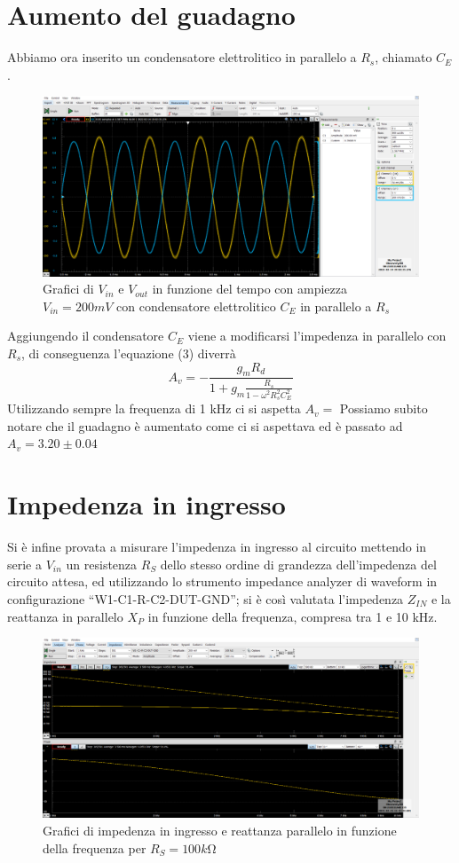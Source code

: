 \documentclass[10pt, a4paper, italian]{article}
\begin{document}
\section{Aumento del guadagno}
Abbiamo ora inserito un condensatore elettrolitico in parallelo a $R_s$, chiamato $C_E$.
\begin{figure}[H]
    \centering
	\includegraphics[scale=0.4]{amp.200.cap}
    \caption{Grafici di $V_{in}$ e $V_{out}$ in funzione del tempo con ampiezza $V_{in}=200 mV$ con condensatore elettrolitico $C_E$ in parallelo a $R_s$}
\end{figure}
Aggiungendo il condensatore $C_E$ viene a modificarsi l'impedenza in parallelo con $R_s$, di conseguenza l'equazione (3) diverrà
\begin{equation}
A_v =-\frac{g_m R_d}{1+g_m \frac{R_s}{1-\omega ^2 R_s^2 C_E^2}}
\end{equation}
Utilizzando sempre la frequenza di 1 kHz ci si aspetta $A_v =$
Possiamo subito notare che il guadagno è aumentato come ci si aspettava ed è passato ad $A_v =3.20 \pm 0.04$
\section{Impedenza in ingresso}
Si è infine provata a misurare l'impedenza in ingresso al circuito mettendo in serie a $V_{in}$ un resistenza $R_S$ dello stesso ordine di grandezza dell'impedenza del circuito attesa, ed utilizzando lo strumento impedance analyzer di waveform in configurazione “W1-C1-R-C2-DUT-GND”; si è così valutata l'impedenza $Z_{IN}$ e la reattanza in parallelo $X_P$ in funzione della frequenza, compresa tra 1 e 10 kHz.
\begin{figure}[H]
    \centering
	\includegraphics[scale=0.4]{impedance}
    \caption{Grafici di impedenza in ingresso e reattanza parallelo in funzione della frequenza per $R_S=100 \si{k\ohm}$}
\end{figure}
\end{document}
